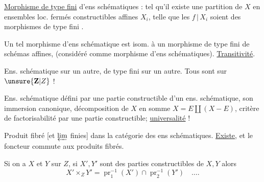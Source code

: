 \uline{Morphisme de type fini}  d'ens schématiques : tel qu'il existe une partition de $X$ en ensembles loc. fermés constructibles affines $X_i$, telle que les $f\,|\,X_i$ soient des morphismes de type fini .


Un tel morphisme d'ens schématique est isom. à un morphisme de type fini de schémas affines, (considéré comme morphisme d'ens schématiques). \uline{Transitivité}.

Ens. schématique sur un autre, de type fini sur un autre. Tous sont sur $\unsure{\mathbf Z|Z}$ !

Ens. schématique défini par une partie constructible d'un ens. schématique, son immersion canonique, décomposition de $X$ en somme $X=E\amalg(X-E)$, critère de factorisabilité par une partie constructible; \uline{universalité} !

Produit fibré [et $\varprojlim$ finies] dans la catégorie des ens schématiques. \uline{Existe}, et le foncteur 
commute aux produits fibrés.

Si on a $X$ et $Y$ sur $Z$, si $X',Y'$ sont des parties constructibles de $X,Y$ alors
\[
X'\times_ZY'=\operatorname{pr}_1^{-1}(X')\cap\operatorname{pr}_2^{-1}(Y')\quad\ldots.
\]
